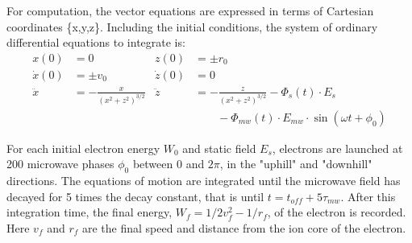 \documentclass[aps,pra,preprint,groupedaddress]{revtex4-1}
\begin{document}
For computation, the vector equations are expressed in terms of Cartesian coordinates \{x,y,z\}. Including the initial conditions, the system of ordinary differential equations to integrate is:
\begin{align*}
x(0) & = 0 & z(0) & = \pm r_0 \\
\dot{x}(0) & = \pm v_0 & \dot{z}(0) & = 0 \\
\ddot{x} & = -\frac{x}{(x^2 + z^2)^{3/2}} & \ddot{z} & = -\frac{z}{(x^2 + z^2)^{3/2}} - \Phi_s(t) \cdot E_s \\
 & & & \quad \quad - \Phi_{mw}(t) \cdot E_{mw} \cdot \sin{(\omega t + \phi_0)}
\end{align*}


For each initial electron energy $W_0$ and static field $E_s$, electrons are launched at 200 microwave phases $\phi_0$ between 0 and $2\pi$, in the "uphill" and "downhill" directions. The equations of motion are integrated until the microwave field has decayed for 5 times the decay constant, that is until  $t=t_{off} + 5\tau_{mw}$. After this integration time, the final energy, $W_f = 1/2 v_f^2 - 1/r_f$, of the electron is recorded. Here $v_f$ and $r_f$ are the final speed and distance from the ion core of the electron.
\end{document}
